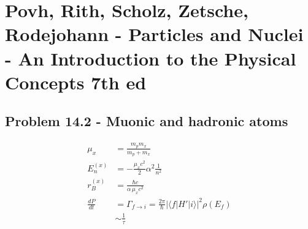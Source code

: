 \documentclass[../main.tex]{subfiles}
\begin{document}
\section{{\sc Povh, Rith, Scholz, Zetsche, Rodejohann} - Particles and Nuclei - An Introduction to the Physical Concepts 7th ed}

\subsection{Problem 14.2 - Muonic and hadronic atoms}

\begin{align}
\mu_x&=\frac{m_pm_x}{m_p+m_x}\\
E_n^{(x)}&=-\frac{\mu_x c^2}{2}\alpha^2\frac{1}{n^2}\\
r_B^{(x)}&=\frac{\hbar c}{\alpha\, \mu_x c^2}\\
\frac{dP}{dt}&=\Gamma_{f\rightarrow i}=\frac{2\pi}{\hbar}|\langle f|H'|i\rangle|^2\rho(E_f)\\
&\sim\frac{1}{\tau}
\end{align}
\end{document}
